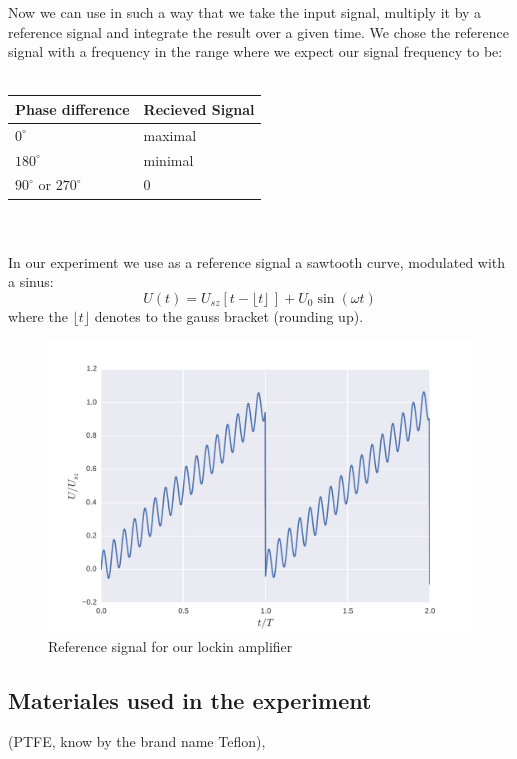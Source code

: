 Now we can 
use in such a way that we take the input signal, multiply it by a
reference signal and integrate the result over a given time.
We chose the reference signal with a frequency in the range where we
expect our signal frequency to be: \\\\
\begin{tabular}{l|l}
    \textbf{Phase difference} & \textbf{Recieved Signal} \\
    \hline
    $0^\circ$ & maximal\\
    $180^{\circ}$ & minimal \\
    $90^\circ$ or $270^\circ$ & 0 
\end{tabular}
\vspace{0.5cm}\\\\
In our experiment we use as a reference signal a sawtooth curve, modulated
with a sinus:
\begin{equation}
   U(t) = U_{sz} \left[ t - \lfloor t \rfloor \,  \right] + U_0 \sin(\omega t)
\end{equation}
where the $\lfloor t \rfloor$ denotes to the gauss bracket (rounding up). 
\begin{figure}[htpb]
    \centering
    \includegraphics[width=0.8\linewidth]{figures/sawtooth}
    \caption{Reference signal for our lockin amplifier}
    \label{fig:sawtooth}
\end{figure}


\subsection{Materiales used in the experiment}

(PTFE, know by the brand name Teflon), 
